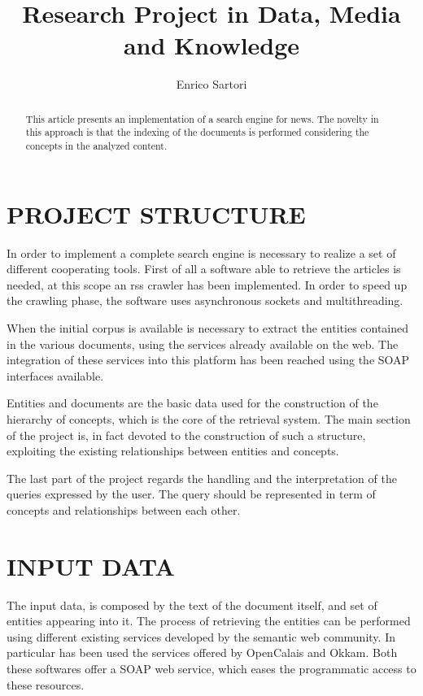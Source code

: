 \documentclass{acm_proc_article-sp-sigmod07}
\begin{document}
\title{Research Project in Data, Media and Knowledge}
\author{Enrico Sartori}

\maketitle

\begin{abstract}
This article presents an implementation of a search engine for news. The
novelty in this approach is that the indexing of the documents is
performed considering the concepts in the analyzed content.
\end{abstract}

\section{PROJECT STRUCTURE}
In order to implement a complete search engine is necessary to realize a
set of different cooperating tools.
First of all a software able to retrieve the articles is needed, at this
scope an rss crawler has been implemented.
In order to speed up the crawling phase, the software uses asynchronous
sockets and multithreading.

When the initial corpus is available is necessary to extract the entities
contained in the various documents, using the services already available
on the web. The integration of these services into this platform has been
reached using the SOAP interfaces available.

Entities and documents are the basic data used for the construction of the
hierarchy of concepts, which is the core of the retrieval system.
The main section of the project is, in fact devoted to the construction of
such a structure, exploiting the existing relationships between entities
and concepts.

The last part of the project regards the handling and the interpretation
of the queries expressed by the user. The query should be represented in
term of concepts and relationships between each other.

\section{INPUT DATA}
The input data, is composed by the text of the document itself, and set of
entities appearing into it.
The process of retrieving the entities can be performed using different
existing services developed by the semantic web community.
In particular has been used the services offered by OpenCalais and Okkam.
Both these softwares offer a SOAP web service, which eases the
programmatic access to these resources.
\end{document}
